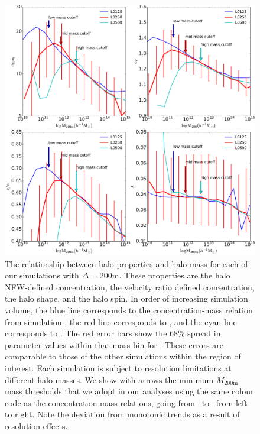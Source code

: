 \documentclass[usenatbib,fleqn]{mnras}
\begin{document}
\begin{figure}
\centering
\includegraphics[width=\textwidth]{masscuts_d200.pdf}
\caption{
The relationship between halo properties and halo mass for each of our simulations with $\Delta =200$m. These properties are the halo NFW-defined concentration, the velocity ratio defined concentration, the halo shape, and the halo spin. In order of increasing simulation volume, the blue line corresponds to the concentration-mass relation from simulation \simA, the red line corresponds to \simB, and the cyan line corresponds to \simC. The red error bars show the 68\% spread in parameter values within that mass bin for \simB. These errors are comparable to those of the other simulations within the region of interest. Each simulation is subject to resolution limitations at different halo masses. We show with arrows the minimum $M_{200\text{m}}$ mass thresholds that we adopt in our analyses using the same colour code as the concentration-mass relations, going from \simA \ to \simC \ from left to right. Note the deviation from monotonic trends as a result of resolution effects.
}
\label{fig:massrelation}
\end{figure}
\end{document}
